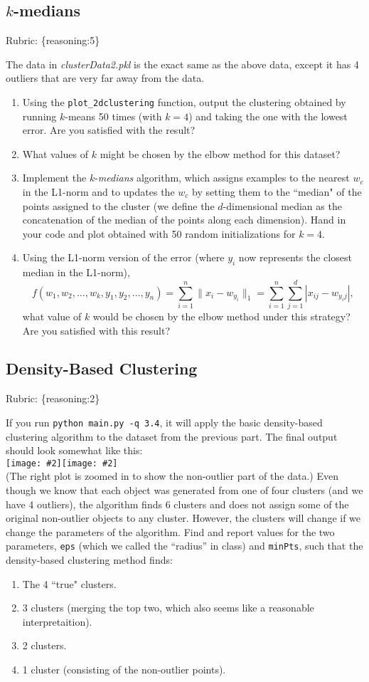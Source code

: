 \documentclass{article}
\def\blu#1{{\color{blu}#1}}
\def\gre#1{{\color{gre}#1}}
\def\norm#1{\|#1\|}
\newcommand{\fig}[2]{\texttt{[image: \#2]}}
\def\enum#1{\begin{enumerate}#1\end{enumerate}}
\def\rubric#1{\gre{Rubric: \{#1\}}}{}
\begin{document}
 \subsection{$k$-medians}
\rubric{reasoning:5}

 The data in \emph{clusterData2.pkl} is the exact same as the above data, except it has 4 outliers that are very far away from the data.

 \blu{\enum{
 \item Using the \texttt{plot\_2dclustering} function, output the clustering obtained by running $k$-means 50 times (with $k=4$)  and taking the one with the lowest error. Are you satisfied with the result?
 \item What values of $k$ might be chosen by the elbow method for this dataset?
 \item Implement the $k$-\emph{medians} algorithm, which assigns examples to the nearest $w_c$ in the L1-norm and to updates the $w_c$ by setting them to the ``median" of the points assigned to the cluster (we define the $d$-dimensional median as the concatenation of the median of the points along each dimension). Hand in your code and plot obtained with 50 random initializations for $k = 4$.
\item Using the L1-norm version of the error (where $y_i$ now represents the closest median in the L1-norm),
\[
f(w_1,w_2,\dots,w_k,y_1,y_2,\dots,y_n) = \sum_{i=1}^n \norm{x_i - w_{y_i}}_1 = \sum_{i=1}^n \sum_{j=1}^d |x_{ij} - w_{y_ij}|,
\]
what value of $k$ would be chosen by the elbow method under this strategy? Are you satisfied with this result?
}
}

\subsection{Density-Based Clustering}
\rubric{reasoning:2}

If you run \texttt{python main.py -q 3.4},
it will apply the basic density-based clustering algorithm to the dataset from the previous part.
The final output should look somewhat like this:\\
\fig{.49}{../figs/density}\fig{.49}{../figs/density2}\\
(The right plot is zoomed in to show the non-outlier part of the data.)
Even though we know that each object was generated from one of four clusters (and we have 4 outliers),
 the algorithm finds 6 clusters and does not assign some of the original non-outlier
  objects to any cluster. However, the clusters will change if we change the parameters
  of the algorithm. Find and report values for the two
  parameters, \texttt{eps} (which we called the ``radius'' in class) and \texttt{minPts},
   such that the density-based clustering method finds:
\blu{\enum{
\item The 4 ``true" clusters.
\item 3 clusters (merging the top two, which also seems like a reasonable interpretaition).
\item 2 clusters.
\item 1 cluster (consisting of the non-outlier points).
}
}
\end{document}
